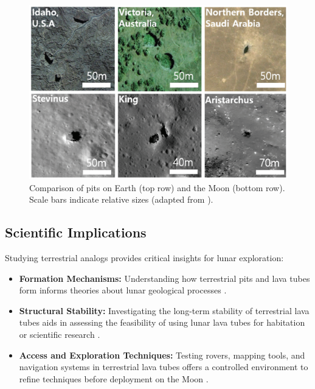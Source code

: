 \begin{figure}[H]
    \centering
    \includegraphics[width=0.8\linewidth]{terrestrial-vs-lunar-pits.png}
    \caption{Comparison of pits on Earth (top row) and the Moon (bottom row). Scale bars indicate relative sizes (adapted from \cite{lunar-pits-entrances-to-caves}).}
    \label{fig:earth-moon-pits}
\end{figure}

\subsection{Scientific Implications}

Studying terrestrial analogs provides critical insights for lunar exploration:
\begin{itemize}
    \item \textbf{Formation Mechanisms:} Understanding how terrestrial pits and lava tubes form informs theories about lunar geological processes \cite{sublunear-lava, radar-observations-lava-tubes}.
    \item \textbf{Structural Stability:} Investigating the long-term stability of terrestrial lava tubes aids in assessing the feasibility of using lunar lava tubes for habitation or scientific research \cite{bases-feng}.
    \item \textbf{Access and Exploration Techniques:} Testing rovers, mapping tools, and navigation systems in terrestrial lava tubes offers a controlled environment to refine techniques before deployment on the Moon \cite{kerber2023, esa-daedalus}.
\end{itemize}
